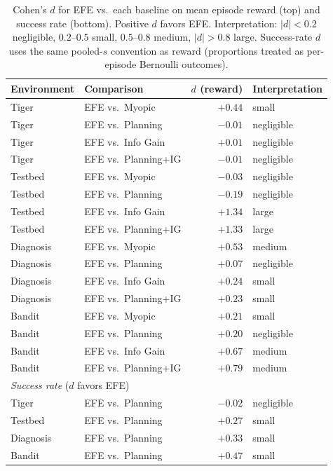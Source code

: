 \documentclass{article}
\begin{document}
\begin{table}[h]
\centering
\caption{Cohen's $d$ for EFE vs.\ each baseline on mean episode reward (top) and success rate (bottom). Positive $d$ favors EFE. Interpretation: $|d|{<}0.2$ negligible, $0.2$--$0.5$ small, $0.5$--$0.8$ medium, $|d|{>}0.8$ large. Success-rate $d$ uses the same pooled-$s$ convention as reward (proportions treated as per-episode Bernoulli outcomes).}
\label{tab:effect_sizes}
\begin{small}
\begin{tabular}{llrl}
\toprule
Environment & Comparison & $d$ (reward) & Interpretation \\
\midrule
Tiger & EFE vs.\ Myopic & $+0.44$ & small \\
Tiger & EFE vs.\ Planning & $-0.01$ & negligible \\
Tiger & EFE vs.\ Info Gain & $+0.01$ & negligible \\
Tiger & EFE vs.\ Planning+IG & $-0.01$ & negligible \\
\midrule
Testbed & EFE vs.\ Myopic & $-0.03$ & negligible \\
Testbed & EFE vs.\ Planning & $-0.19$ & negligible \\
Testbed & EFE vs.\ Info Gain & $+1.34$ & large \\
Testbed & EFE vs.\ Planning+IG & $+1.33$ & large \\
\midrule
Diagnosis & EFE vs.\ Myopic & $+0.53$ & medium \\
Diagnosis & EFE vs.\ Planning & $+0.07$ & negligible \\
Diagnosis & EFE vs.\ Info Gain & $+0.24$ & small \\
Diagnosis & EFE vs.\ Planning+IG & $+0.23$ & small \\
\midrule
Bandit & EFE vs.\ Myopic & $+0.21$ & small \\
Bandit & EFE vs.\ Planning & $+0.20$ & negligible \\
Bandit & EFE vs.\ Info Gain & $+0.67$ & medium \\
Bandit & EFE vs.\ Planning+IG & $+0.79$ & medium \\
\midrule
\multicolumn{4}{l}{\textit{Success rate} ($d$ favors EFE)} \\
\midrule
Tiger & EFE vs.\ Planning & $-0.02$ & negligible \\
Testbed & EFE vs.\ Planning & $+0.27$ & small \\
Diagnosis & EFE vs.\ Planning & $+0.33$ & small \\
Bandit & EFE vs.\ Planning & $+0.47$ & small \\
\bottomrule
\end{tabular}
\end{small}
\end{table}
\end{document}
